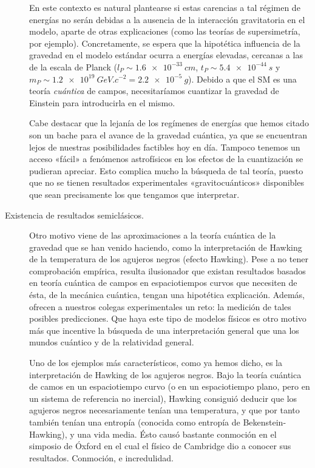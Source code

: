 \documentclass[11pt,a4paper,titlepage]{article}
\begin{document}
\begin{description}
{  En este contexto es natural plantearse si estas carencias a tal régimen de energías no serán debidas a la ausencia de la interacción gravitatoria en el modelo, aparte de otras explicaciones (como las teorías de supersimetría, por ejemplo). Concretamente, se espera que la hipotética influencia de la gravedad en el modelo estándar ocurra a energías elevadas, cercanas a las de la escala de Planck ($l_P\sim\SI{1.6e-33}{cm}$, $t_P\sim\SI{5.4e-44}{s}$ y $m_P\sim\SI{1.2e19}{GeV.c^{-2}}=\SI{2.2e-5}{g}$). Debido a que el SM es una teoría \textit{cuántica} de campos, necesitaríamos cuantizar la gravedad de Einstein para introducirla en el mismo.

  Cabe destacar que la lejanía de los regímenes de energías que hemos citado son un bache para el avance de la gravedad cuántica, ya que se encuentran lejos de nuestras posibilidades factibles hoy en día. Tampoco tenemos un acceso «fácil» a fenómenos astrofísicos en los efectos de la cuantización se pudieran apreciar. Esto complica mucho la búsqueda de tal teoría, puesto que no se tienen resultados experimentales «gravitocuánticos» disponibles que sean precisamente los que tengamos que interpretar.}

  \item[Existencia de resultados semiclásicos.]{Otro motivo viene de las aproximaciones a la teoría cuántica de la gravedad que se han venido haciendo, como la interpretación de Hawking de la temperatura de los agujeros negros (efecto Hawking). Pese a no tener comprobación empírica, resulta ilusionador que existan resultados basados en teoría cuántica de campos en espaciotiempos curvos que necesiten de ésta, de la mecánica cuántica, tengan una hipotética explicación. Además, ofrecen a nuestros colegas experimentales un reto: la medición de tales posibles predicciones. Que haya este tipo de modelos físicos es otro motivo más que incentive la búsqueda de una interpretación general que una los mundos cuántico y de la relatividad general.

  Uno de los ejemplos más característicos, como ya hemos dicho, es la interpretación de Hawking de los agujeros negros. Bajo la teoría cuántica de camos en un espaciotiempo curvo (o en un espaciotiempo plano, pero en un sistema de referencia no inercial), Hawking consiguió deducir que los agujeros negros necesariamente tenían una temperatura, y que por tanto también tenían una entropía (conocida como entropía de Bekenstein-Hawking), y una vida media. Ésto causó bastante conmoción en el simposio de Óxford en el cual el físico de Cambridge dio a conocer sus resultados. Conmoción, e incredulidad.

}
\end{description}
\end{document}
